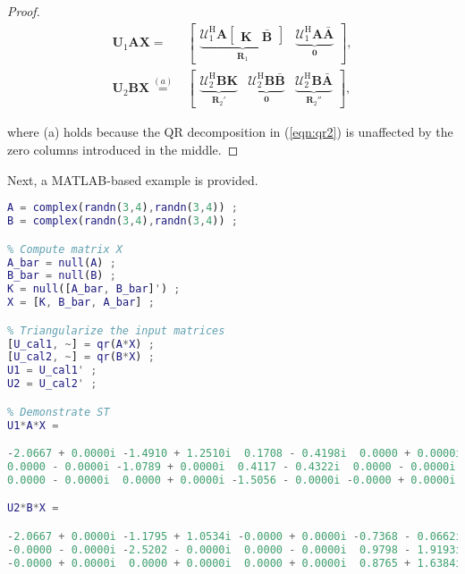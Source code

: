 \begin{proof}
\begin{align}\boldsymbol{U}_1\boldsymbol{A}\boldsymbol{X} = &\begin{bmatrix}\underbrace{\boldsymbol{\mathcal{U}}_1^\mathrm{H} \boldsymbol{A} \begin{bmatrix}\boldsymbol{K} & \bar{\boldsymbol{B}}\end{bmatrix}}_{\boldsymbol{R}_1} &  \underbrace{\boldsymbol{\mathcal{U}}_1^\mathrm{H} \boldsymbol{A} \bar{\boldsymbol{A}}}_{\boldsymbol{0}}\end{bmatrix}, \\ \boldsymbol{U}_2\boldsymbol{B}\boldsymbol{X} \overset{(a)}{=} &\begin{bmatrix} \underbrace{\boldsymbol{\mathcal{U}}_2^\mathrm{H} \boldsymbol{B} \boldsymbol{K}}_{\boldsymbol{R}_2'} & \underbrace{\boldsymbol{\mathcal{U}}_2^\mathrm{H} \boldsymbol{B} \bar{\boldsymbol{B}}}_{\boldsymbol{0}} &  \underbrace{\boldsymbol{\mathcal{U}}_2^\mathrm{H} \boldsymbol{B} \bar{\boldsymbol{A}}}_{\boldsymbol{R}_2''}\end{bmatrix},\end{align}

where (a) holds because the QR decomposition in (\ref{eqn:qr2}) is unaffected by the zero columns introduced in the middle.
\end{proof}

Next, a MATLAB-based example is provided.

\begin{lstlisting}[language=MATLAB,numbers=none]
% Generate compatible matrices
A = complex(randn(3,4),randn(3,4)) ;
B = complex(randn(3,4),randn(3,4)) ;

% Compute matrix X
A_bar = null(A) ;
B_bar = null(B) ;
K = null([A_bar, B_bar]') ;
X = [K, B_bar, A_bar] ;

% Triangularize the input matrices
[U_cal1, ~] = qr(A*X) ;
[U_cal2, ~] = qr(B*X) ;
U1 = U_cal1' ;
U2 = U_cal2' ;

% Demonstrate ST
U1*A*X =

-2.0667 + 0.0000i -1.4910 + 1.2510i  0.1708 - 0.4198i  0.0000 + 0.0000i
0.0000 - 0.0000i -1.0789 + 0.0000i  0.4117 - 0.4322i  0.0000 - 0.0000i
0.0000 - 0.0000i  0.0000 + 0.0000i -1.5056 - 0.0000i -0.0000 + 0.0000i

U2*B*X =

-2.0667 + 0.0000i -1.1795 + 1.0534i -0.0000 + 0.0000i -0.7368 - 0.0662i
-0.0000 - 0.0000i -2.5202 - 0.0000i  0.0000 - 0.0000i  0.9798 - 1.9193i
-0.0000 + 0.0000i  0.0000 + 0.0000i  0.0000 + 0.0000i  0.8765 + 1.6384i
\end{lstlisting}


